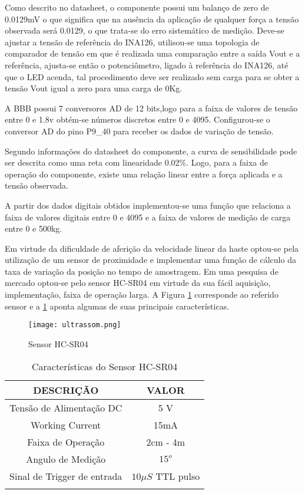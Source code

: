 		Como descrito no datasheet, o componente possui um balanço de zero de 0.0129mV o que significa que na ausência da aplicação de qualquer força a tensão observada será 0.0129, o que trata-se do erro sistemático de medição. Deve-se ajustar a tensão de referência do INA126, utilisou-se uma topologia de comparador de tensão em que é realizada uma comparação entre a saída Vout e a referência, ajusta-se então o potenciômetro, ligado à referência do INA126, até que o LED acenda, tal procedimento deve ser realizado sem carga para se obter a tensão Vout igual a zero para uma carga de 0Kg.

		A BBB possui 7 conversores AD de 12 bits,logo para a faixa de valores de tensão entre 0 e 1.8v obtém-se números discretos entre 0 e 4095. Configurou-se o conversor AD do pino P9\_40 para receber os dados de variação de tensão.

		Segundo informações do datasheet do componente, a curva de sensibilidade pode ser descrita como uma reta com linearidade 0.02\%. Logo, para a faixa de operação do componente, existe uma relação linear entre a força aplicada e a tensão observada. 

		A partir dos dados digitais obtidos implementou-se uma função que relaciona a faixa de valores digitais entre 0 e 4095 e a faixa de valores de medição de carga entre 0 e 500kg.  



		Em virtude da dificuldade de aferição da velocidade linear da haste optou-se pela utilização de um sensor de proximidade e implementar uma função de cálculo da taxa de variação da posição no tempo de amostragem. Em uma pesquisa de mercado optou-se pelo sensor HC-SR04 em virtude da sua fácil aquisição, implementação, faixa de operação larga. A Figura \ref{ultrassom} corresponde ao referido sensor e a  \ref{descricaoHCSR04} aponta algumas de suas principais características.
	
		\begin{figure}[!h]
			\centering
			\texttt{[image: ultrassom.png]}
			\caption{Sensor HC-SR04}
			\label{ultrassom}
		\end{figure}

		\begin{table}[!h]
		\centering
		\caption{Características do Sensor HC-SR04}
		\vspace{0.5cm}
		\begin{tabular}{ c c}
		\hline
		\textbf{DESCRIÇÃO}	&	\textbf{VALOR}\\
		\hline
		Tensão de Alimentação DC & 5 V\\
		\hline
		Working Current & 15mA\\
		\hline
		Faixa de Operação & 2cm -  4m\\
		\hline
		Angulo de Medição &  $15^o$\\
		\hline
		Sinal de Trigger de entrada & $10\mu S$ TTL pulso\\
		\hline

		\label{descricaoHCSR04}
		\end{tabular}
		\end{table}

